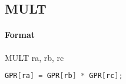\subsection{MULT}


\paragraph{Format} MULT ra, rb, rc

\begin{lstlisting}[language=C]
    GPR[ra] = GPR[rb] * GPR[rc];
\end{lstlisting}